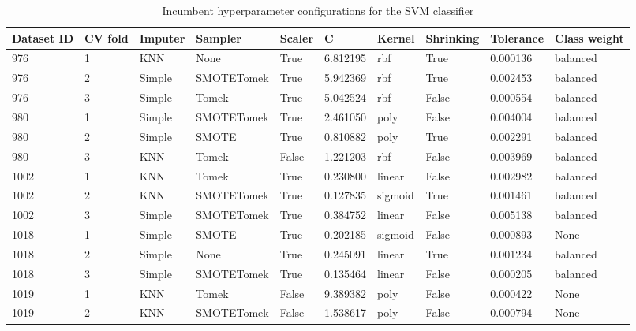 \documentclass[11pt]{article}
\begin{document}
\begin{table}
\footnotesize
\caption{Incumbent hyperparameter configurations for the SVM classifier}
\center
\begin{tabular}{llllllllll}
\toprule
Dataset ID & CV fold & Imputer &    Sampler & Scaler &        C &  Kernel & Shrinking &  Tolerance & Class weight \\
\midrule
       976 &       1 &     KNN &       None &   True & 6.812195 &     rbf &      True & 0.000136 &     balanced \\
       976 &       2 &  Simple & SMOTETomek &   True & 5.942369 &     rbf &      True & 0.002453 &     balanced \\
       976 &       3 &  Simple &      Tomek &   True & 5.042524 &     rbf &     False & 0.000554 &     balanced \\
\midrule
       980 &       1 &  Simple & SMOTETomek &   True & 2.461050 &    poly &     False & 0.004004 &     balanced \\
       980 &       2 &  Simple &      SMOTE &   True & 0.810882 &    poly &      True & 0.002291 &     balanced \\
       980 &       3 &     KNN &      Tomek &  False & 1.221203 &     rbf &     False & 0.003969 &     balanced \\
\midrule
      1002 &       1 &     KNN &      Tomek &   True & 0.230800 &  linear &     False & 0.002982 &     balanced \\
      1002 &       2 &     KNN & SMOTETomek &   True & 0.127835 & sigmoid &      True & 0.001461 &     balanced \\
      1002 &       3 &  Simple & SMOTETomek &   True & 0.384752 &  linear &     False & 0.005138 &     balanced \\
\midrule
      1018 &       1 &  Simple &      SMOTE &   True & 0.202185 & sigmoid &     False & 0.000893 &         None \\
      1018 &       2 &  Simple &       None &   True & 0.245091 &  linear &      True & 0.001234 &     balanced \\
      1018 &       3 &  Simple & SMOTETomek &   True & 0.135464 &  linear &     False & 0.000205 &     balanced \\
\midrule
      1019 &       1 &     KNN &      Tomek &  False & 9.389382 &    poly &     False & 0.000422 &         None \\
      1019 &       2 &     KNN & SMOTETomek &  False & 1.538617 &    poly &     False & 0.000794 &         None \\

\end{tabular}
\end{table}
\end{document}
